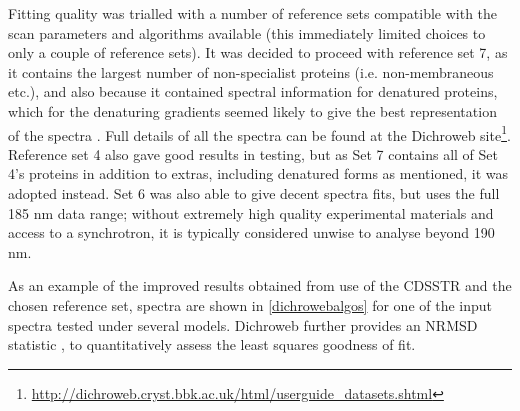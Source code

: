 Fitting quality was trialled with a number of reference sets compatible with the scan parameters and algorithms available (this immediately limited choices to only a couple of reference sets). It was decided to proceed with reference set 7, as it contains the largest number of non-specialist proteins (i.e. non-membraneous etc.), and also because it contained spectral information for denatured proteins, which for the denaturing gradients seemed likely to give the best representation of the spectra \citep{Sreerama2000b,Sreerama2000a}. Full details of all the spectra can be found at the Dichroweb site\footnote{\url{http://dichroweb.cryst.bbk.ac.uk/html/userguide_datasets.shtml}}. Reference set 4 also gave good results in testing, but as Set 7 contains all of Set 4's proteins in addition to extras, including denatured forms as mentioned, it was adopted instead. Set 6 was also able to give decent spectra fits, but uses the full 185 nm data range; without extremely high quality experimental materials and access to a synchrotron, it is typically considered unwise to analyse beyond 190 nm.

As an example of the improved results obtained from use of the CDSSTR and the chosen reference set, spectra are shown in \vref{dichrowebalgos} for one of the input spectra tested under several models. Dichroweb further provides an NRMSD statistic \citep{Mao1982}, to quantitatively assess the least squares goodness of fit.

